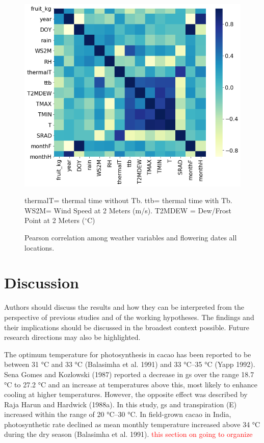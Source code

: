 \documentclass[gene,journal,article,submit,moreauthors,pdftex]{Definitions/mdpi}
\begin{document}
\begin{figure}[h!]
	\centering
	\includegraphics[scale=0.4]{images/heatm.png}\\
	\label{fig:heat}
	\caption{\footnotesize {Pearson correlation among weather variables and flowering dates all locations. \\}} 
	{\footnotesize thermalT= thermal time without Tb. ttb= thermal time with Tb. WS2M= Wind Speed at 2 Meters (m/s). T2MDEW = Dew/Frost Point at 2 Meters ($^\circ$C) }
\end{figure}
\newpage


\section{Discussion}
Authors should discuss the results and how they can be interpreted from the perspective of previous studies and of the working hypotheses. The findings and their implications should be discussed in the broadest context possible. Future research directions may also be highlighted.


The optimum temperature for photosynthesis in cacao has
been reported to be between 31 °C and 33 °C (Balasimha et al.
1991) and 33 °C–35 °C (Yapp 1992). Sena Gomes and
Kozlowski (1987) reported a decrease in gs over the range
18.7 °C to 27.2 °C and an increase at temperatures above this,
most likely to enhance cooling at higher temperatures.
However, the opposite effect was described by Raja Harun
and Hardwick (1988a). In this study, gs and transpiration (E)
increased within the range of 20 °C–30 °C. In field-grown
cacao in India, photosynthetic rate declined as mean monthly
temperature increased above 34 °C during the dry season
(Balasimha et al. 1991). \cite{lahive2019}
\textcolor{red}{this section on going to organize}
\end{document}
